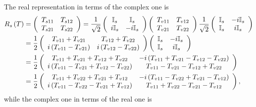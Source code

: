 \documentclass[aps,preprint]{revtex4}%
\begin{document}
The real representation in terms of the complex one is
\begin{align}
R_{s}\left(  T\right)   &  =\left(
\begin{array}
[c]{cc}%
T_{s11} & T_{s12}\\
T_{s21} & T_{s22}%
\end{array}
\right)  =\frac{1}{\sqrt{2}}\left(
\begin{array}
[c]{cc}%
\mathbb{I}_{s} & \mathbb{I}_{s}\\
i\mathbb{I}_{s} & -i\mathbb{I}_{s}%
\end{array}
\right)  \left(
\begin{array}
[c]{cc}%
T_{v11} & T_{v12}\\
T_{v21} & T_{v22}%
\end{array}
\right)  \frac{1}{\sqrt{2}}\left(
\begin{array}
[c]{cc}%
\mathbb{I}_{s} & -i\mathbb{I}_{s}\\
\mathbb{I}_{s} & i\mathbb{I}_{s}%
\end{array}
\right) \\
&  =\frac{1}{2}\left(
\begin{array}
[c]{cc}%
T_{v11}+T_{v21} & T_{v12}+T_{v22}\\
i\left(  T_{v11}-T_{v21}\right)  & i\left(  T_{v12}-T_{v22}\right)
\end{array}
\right)  \left(
\begin{array}
[c]{cc}%
\mathbb{I}_{s} & -i\mathbb{I}_{s}\\
\mathbb{I}_{s} & i\mathbb{I}_{s}%
\end{array}
\right) \\
&  =\frac{1}{2}\left(
\begin{array}
[c]{cc}%
T_{v11}+T_{v21}+T_{v12}+T_{v22} & -i\left(  T_{v11}+T_{v21}-T_{v12}%
-T_{v22}\right) \\
i\left(  T_{v11}-T_{v21}+T_{v12}-T_{v22}\right)  & T_{v11}-T_{v21}%
-T_{v12}+T_{v22}%
\end{array}
\right) \\
&  =\frac{1}{2}\left(
\begin{array}
[c]{cc}%
T_{v11}+T_{v22}+T_{v21}+T_{v12} & -i\left(  T_{v11}-T_{v22}+T_{v21}%
-T_{v12}\right) \\
i\left(  T_{v11}-T_{v22}-T_{v21}+T_{v12}\right)  & T_{v11}+T_{v22}%
-T_{v21}-T_{v12}%
\end{array}
\right)  ,
\end{align}
while the complex one in terms of the real one is
\end{document}
